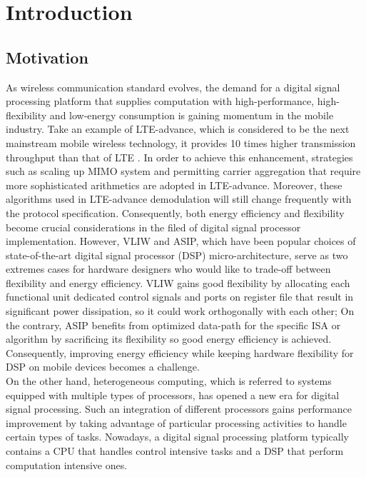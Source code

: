 \chapter{Introduction}

    \section{Motivation}
        As wireless communication standard evolves, the demand for a digital signal processing platform that supplies computation with high-performance, high-flexibility and low-energy consumption is gaining momentum in the mobile industry. 
        Take an example of LTE-advance, which is considered to be the next mainstream mobile wireless technology, it provides 10 times higher transmission throughput than that of LTE \cite{lte}. 
        In order to achieve this enhancement, strategies such as scaling up MIMO system and permitting carrier aggregation \cite{carrier} that require more sophisticated arithmetics are adopted in LTE-advance.
        Moreover, these algorithms used in LTE-advance demodulation will still change frequently with the protocol specification.
        Consequently, both energy efficiency and flexibility become crucial considerations in the filed of digital signal processor implementation. 
        However, VLIW and ASIP, which have been popular choices of state-of-the-art digital signal processor (DSP) micro-architecture, serve as two extremes cases for hardware designers who would like to trade-off between flexibility and energy efficiency. 
        VLIW gains good flexibility by allocating each functional unit dedicated control signals and ports on register file that result in significant power dissipation, so it could work orthogonally with each other; 
        On the contrary, ASIP benefits from optimized data-path for the specific ISA or algorithm by sacrificing its flexibility so good energy efficiency is achieved. 
        Consequently, improving energy efficiency while keeping hardware flexibility for DSP on mobile devices becomes a challenge.	
        \\\indent 
        On the other hand, heterogeneous computing, which is referred to systems equipped with multiple types of processors, has opened a new era for digital signal processing. 
        Such an integration of different processors gains performance improvement by taking advantage of particular processing activities to handle certain types of tasks.
        Nowadays, a digital signal processing platform typically contains a CPU that handles control intensive tasks and a DSP that perform computation intensive ones.
